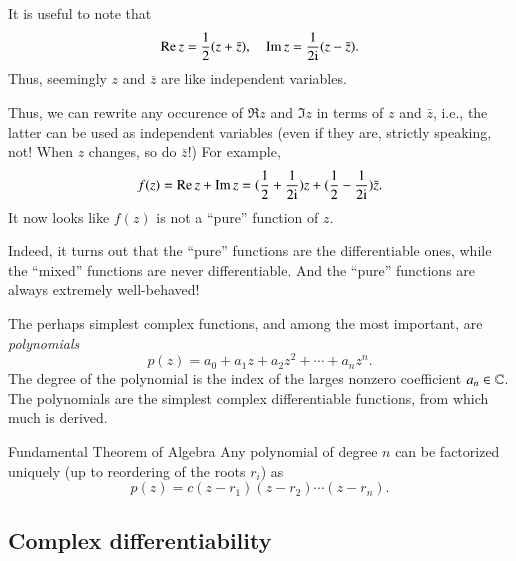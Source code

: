 It is useful to note that
\begin{equation}
    \operatorname{Re} z = \frac{1}{2}(z + \bar{z}), \quad \operatorname{Im} z = \frac{1}{2\mathrm{i}} (z - \bar{z}).
\end{equation}
Thus, seemingly $z$ and $\bar{z}$ are like independent variables. 

Thus, we can rewrite any occurence of $\Re z$ and $\Im z$ in terms of $z$ and $\bar{z}$, i.e., the latter can be used as independent variables (even if they are, strictly speaking, not! When $z$ changes, so do $\bar{z}$!) For example,
\begin{equation}
    f(z) = \operatorname{Re} z + \operatorname{Im} z = (\frac{1}{2} + \frac{1}{2\mathrm{i}}) z + (\frac{1}{2} - \frac{1}{2\mathrm{i}}) \bar{z}.
\end{equation}
It now looks like $f(z)$ is not a ``pure'' function of $z$.

Indeed, it turns out that the ``pure'' functions are the differentiable ones, while the ``mixed'' functions are never differentiable. And the ``pure'' functions are always extremely well-behaved!

\begin{myExample}{}{}
The perhaps simplest complex functions, and among the most important, are \emph{polynomials}
\begin{equation}
    p(z) = a_0 + a_1 z + a_2 z^2 + \cdots + a_n z^n.
\end{equation}
The degree of the polynomial is the index of the larges nonzero coefficient $a_n \in \mathbb{C}$. The polynomials are the simplest complex differentiable functions, from which much is derived.
\end{myExample}

\begin{myTheorem}{Fundamental Theorem of Algebra}{}
    Any polynomial of degree $n$ can be factorized uniquely (up to reordering of the roots $r_i$) as
    \begin{equation}
        p(z) = c (z-r_1)(z-r_2)\cdots(z-r_n).
    \end{equation}
\end{myTheorem}


\subsection{Complex differentiability}


